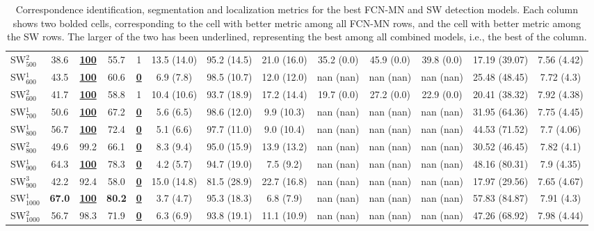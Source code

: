 \documentclass[a4paper,authoryear,review]{elsarticle}
\begin{document}
\begin{table}[]
\begin{adjustbox}{angle=90}
{\begin{tabular}{lcccccccccccc}
					SW$_{500}^{2}$ & 38.6 & {\ul \textbf{100}} & 55.7 & 1 & 13.5 (14.0) & 95.2 (14.5) & 21.0 (16.0) & 35.2 (0.0) & 45.9 (0.0) & 39.8 (0.0) & 17.19 (39.07) & 7.56 (4.42) \\
					SW$_{600}^{1}$ & 43.5 & {\ul \textbf{100}} & 60.6 & {\ul \textbf{0}} & 6.9 (7.8) & 98.5 (10.7) & 12.0 (12.0) & nan (nan) & nan (nan) & nan (nan) & 25.48 (48.45) & 7.72 (4.3) \\
					SW$_{600}^{2}$ & 41.7 & {\ul \textbf{100}} & 58.8 & 1 & 10.4 (10.6) & 93.7 (18.9) & 17.2 (14.4) & 19.7 (0.0) & 27.2 (0.0) & 22.9 (0.0) & 20.41 (38.32) & 7.92 (4.38) \\
					SW$_{700}^{1}$ & 50.6 & {\ul \textbf{100}} & 67.2 & {\ul \textbf{0}} & 5.6 (6.5) & 98.6 (12.0) & 9.9 (10.3) & nan (nan) & nan (nan) & nan (nan) & 31.95 (64.36) & 7.75 (4.45) \\
					SW$_{800}^{1}$ & 56.7 & {\ul \textbf{100}} & 72.4 & {\ul \textbf{0}} & 5.1 (6.6) & 97.7 (11.0) & 9.0 (10.4) & nan (nan) & nan (nan) & nan (nan) & 44.53 (71.52) & 7.7 (4.06) \\
					SW$_{800}^{2}$ & 49.6 & 99.2 & 66.1 & {\ul \textbf{0}} & 8.3 (9.4) & 95.0 (15.9) & 13.9 (13.2) & nan (nan) & nan (nan) & nan (nan) & 30.52 (46.45) & 7.82 (4.1) \\
					SW$_{900}^{1}$ & 64.3 & {\ul \textbf{100}} & 78.3 & {\ul \textbf{0}} & 4.2 (5.7) & 94.7 (19.0) & 7.5 (9.2) & nan (nan) & nan (nan) & nan (nan) & 48.16 (80.31) & 7.9 (4.35) \\
					SW$_{900}^{3}$ & 42.2 & 92.4 & 58.0 & {\ul \textbf{0}} & 15.0 (14.8) & 81.5 (28.9) & 22.7 (16.8) & nan (nan) & nan (nan) & nan (nan) & 17.97 (29.56) & 7.65 (4.67) \\
					SW$_{1000}^{1}$ & \textbf{67.0} & {\ul \textbf{100}} & \textbf{80.2} & {\ul \textbf{0}} & 3.7 (4.7) & 95.3 (18.3) & 6.8 (7.9) & nan (nan) & nan (nan) & nan (nan) & 57.83 (84.87) & 7.91 (4.3) \\
					SW$_{1000}^{2}$ & 56.7 & 98.3 & 71.9 & {\ul \textbf{0}} & 6.3 (6.9) & 93.8 (19.1) & 11.1 (10.9) & nan (nan) & nan (nan) & nan (nan) & 47.26 (68.92) & 7.98 (4.44) \\ \hline
				\end{tabular}     
			}
		\end{adjustbox}
		\caption{Correspondence identification, segmentation and localization metrics for the best FCN-MN and SW detection models.   Each column shows two bolded cells, corresponding to the cell with better metric among all FCN-MN rows, and the cell with better metric among the SW rows. The larger of the two has been underlined, representing the best among all combined models, i.e., the best of the column.}        
		\label{tab:TablaXX}
	\end{table}
	
\end{document}
